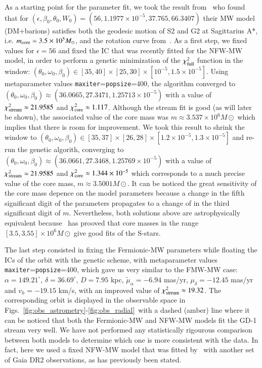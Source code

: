\documentclass[twocolumn]{aa}
\begin{document}
As a starting point for the parameter fit, we took the result from~\citet{2020A&A...641A..34B} who found that for $(\epsilon, \beta_0, \theta_0, W_0)=(56, 1.1977\times10^{-5}, 37.765, 66.3407)$
their MW model (DM+barions) satisfies both the geodesic motion of S2 and G2 at Sagittarius A*, i.e. $m_{\rm core}=3.5\times 10^5 M_\odot$, and the rotation curve from~\citet{sofue_rotation_2013}.
As a first step, we fixed values for $\epsilon=56$ and
fixed the IC that was recently fitted for the NFW-MW model, in order to perform a genetic minimization of the
$\chi^2_{\rm{full}}$ function in the window:
$(\theta_0,\omega_0, \beta_0)\in [35, 40]\times[25, 30]\times[10^{-5}, 1.5\times10^{-5}]$. Using metaparameter values \texttt{maxiter}=\texttt{popsize}=400, the algorithm converged to
$(\theta_0, \omega_0, \beta_0)\approx (36.0665,27.3471 , 1.25713\times10^{-5})$
 with a value of $\chi^2_{\rm{stream}}\approx 21.9585$ and  $\chi^2_{\rm{core}}\approx 1.117$.
 Although the stream fit is good (as will later be shown), the associated value of the core mass was
 $m\approx 3.537\times 10^6 M\odot$ which implies that there is room for improvement.
We took this result to shrink the window to $(\theta_0,\omega_0, \beta_0)\in [35, 37]\times[26, 28]\times[1.2\times 10^{-5}, 1.3\times10^{-5}]$ and re-run the genetic algorith, converging
to $(\theta_0, \omega_0, \beta_0)\approx (36.0661, 27.3468,1.25769\times10^{-5})$ with a value of $\chi^2_{\rm{stream}}\approx 21.9585$ and  $\chi^2_{\rm{core}}\approx 1.344\times10^{-5}$ which corresponds to
 a much precise value of the core mass, $m\approx 3.5001 M\odot$. It can be noticed the great sensitivity of the core mass depence on the model parameters because a change in the fifth significant digit of the parameters propagates to a change of in  the third significant digit of $m$. Nevertheless, both solutions above are astrophysically equivalent because~\citet{2021MNRAS.505L..64B} has prooved that core masses in the range $[3.5, 3.55]\times 10^6 M\odot$ give good fits of the S-stars.

The last step consisted in fixing the Fermionic-MW parameters while floating the ICs of the orbit with the genetic scheme, with metaparameter values \texttt{maxiter}=\texttt{popsize}=400, which gave us very similar to the FMW-MW case:
$\alpha=149.21^{\circ}$, $\delta=36.69^{\circ}$, $D=7.95$ kpc,
$\tilde{\mu}_\alpha=-6.94$ mas/yr, $\mu_\delta=-12.45$ mas/yr and $v_h=-19.15$ km/s, with an improved
value of $\chi^2_{\rm{stream}}\approx 19.32$.
The corresponding orbit is displayed in the observable space in
Figs.~\ref{fig:obs_astrometry}-\ref{fig:obs_radial}~with a dashed (amber) line where it can be noticed that both the Fermionic-MW and NFW-MW models fit the GD-1 stream very well.
We have not performed any statistically rigourous comparison between both models to determine which one is
more consistent with the data. In fact, here we used a fixed NFW-MW model that was fitted by~\citet{2019MNRAS.486.2995M} with another set of Gaia DR2 observations, as has previously been stated.\\
%
\end{document}

